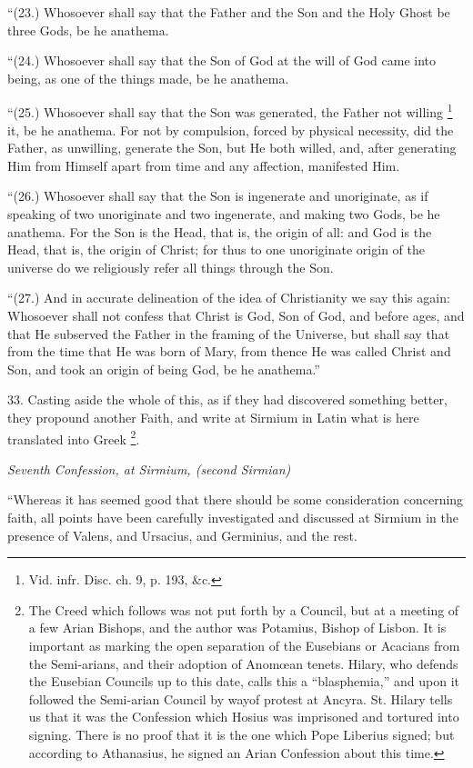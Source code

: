``(23.) Whosoever shall say
that the Father and the Son and the Holy Ghost be three Gods, be he
anathema.

``(24.) Whosoever shall say
that the Son of God at the will of God came into being, as one of the
things made, be he anathema.

``(25.) Whosoever shall say
that the Son was generated, the Father not willing \footnote{Vid. infr. Disc. ch. 9, p. 193, \&c.} it, be he anathema. For not by compulsion, forced by physical
necessity, did the Father, as unwilling, generate the Son, but He both
willed, and, after generating Him from Himself apart from time and any
affection, manifested Him.

``(26.) Whosoever shall say
that the Son is ingenerate and unoriginate, as if speaking of two
unoriginate and two ingenerate, and making two Gods, be he anathema.
For the Son is the Head, that is, the origin of all: and God is the
Head, that is, the origin of Christ; for thus to one unoriginate
origin of the universe do we religiously refer all things through the
Son.

``(27.) And in accurate
delineation of the idea of Christianity we say this again: Whosoever
shall not confess that Christ is God, Son of God, and before ages, and
that He subserved the Father in the framing of the Universe, but shall
say that from the time that He was born of Mary, from thence He was
called Christ and Son, and took an origin of being God, be he
anathema.''

33. Casting aside the whole of
this, as if they had discovered something better, they propound
another Faith, and write at Sirmium in Latin what is here translated
into Greek \footnote{The Creed which follows was not put forth by a Council, but at a
meeting of a few Arian Bishops, and the author was Potamius, Bishop of
Lisbon. It is important as marking the open separation of the
Eusebians or Acacians from the Semi-arians, and their adoption of Anomœan
tenets. Hilary, who defends the Eusebian Councils up to this date,
calls this a ``blasphemia,'' and upon it followed the Semi-arian Council
by way\emph{}of protest at Ancyra. St. Hilary tells us that it was
the Confession which Hosius was imprisoned and tortured into signing.
There is no proof that it is the one which Pope Liberius signed; but
according to Athanasius, he signed an Arian Confession about this
time.}.

\emph{Seventh
Confession, at Sirmium, (second Sirmian)}

``Whereas it has seemed good
that there should be some consideration concerning faith, all points
have been carefully investigated and discussed at Sirmium in the
presence of Valens, and Ursacius, and Germinius, and the rest.

